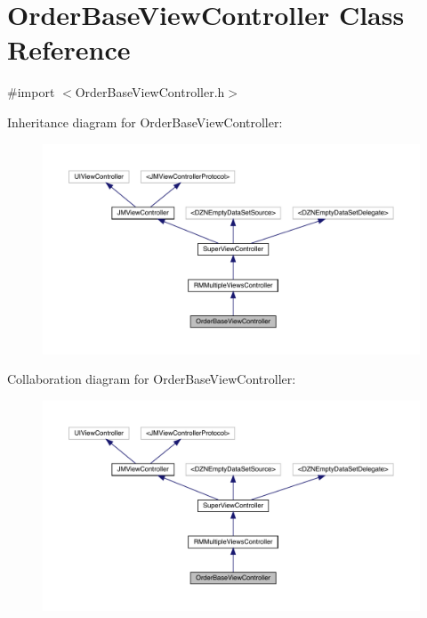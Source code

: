 \hypertarget{interface_order_base_view_controller}{}\section{Order\+Base\+View\+Controller Class Reference}
\label{interface_order_base_view_controller}


{\ttfamily \#import $<$Order\+Base\+View\+Controller.\+h$>$}



Inheritance diagram for Order\+Base\+View\+Controller\+:\nopagebreak
\begin{figure}[H]
\begin{center}
\leavevmode
\includegraphics[width=350pt]{interface_order_base_view_controller__inherit__graph}
\end{center}
\end{figure}


Collaboration diagram for Order\+Base\+View\+Controller\+:\nopagebreak
\begin{figure}[H]
\begin{center}
\leavevmode
\includegraphics[width=350pt]{interface_order_base_view_controller__coll__graph}
\end{center}
\end{figure}
